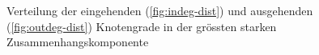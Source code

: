\begin{figure}[t]
  \centering
  \caption{Verteilung der eingehenden (\ref{fig:indeg-dist}) und
    ausgehenden (\ref{fig:outdeg-dist}) Knotengrade in der gr\"ossten
    starken Zusammenhangskomponente}
  \label{fig:comsizedist}
\end{figure}

